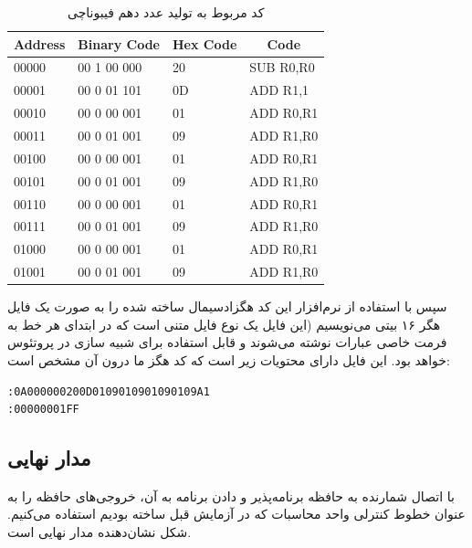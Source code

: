 \documentclass{article}
\begin{document}
\begin{table}[H]
\centering
\begin{latin}
\begin{tabular}{|l|l|l|l|}
\hline
\multicolumn{1}{|c|}{\textbf{Address}} & \multicolumn{1}{c|}{\textbf{Binary Code}} & \multicolumn{1}{c|}{\textbf{Hex Code}} & \multicolumn{1}{c|}{\textbf{Code}} \\ \hline
00000 & 00 1 00 000 & 20 & SUB R0,R0 \\ \hline
00001 & 00 0 01 101 & 0D & ADD R1,1  \\ \hline
00010 & 00 0 00 001 & 01 & ADD R0,R1 \\ \hline
00011 & 00 0 01 001 & 09 & ADD R1,R0 \\ \hline
00100 & 00 0 00 001 & 01 & ADD R0,R1 \\ \hline
00101 & 00 0 01 001 & 09 & ADD R1,R0 \\ \hline
00110 & 00 0 00 001 & 01 & ADD R0,R1 \\ \hline
00111 & 00 0 01 001 & 09 & ADD R1,R0 \\ \hline
01000 & 00 0 00 001 & 01 & ADD R0,R1 \\ \hline
01001 & 00 0 01 001 & 09 & ADD R1,R0 \\ \hline
\end{tabular}
\end{latin}
\caption{کد مربوط به تولید عدد دهم فیبوناچی}
\label{tab:codes}
\end{table}

سپس با استفاده از نرم‌افزار  این کد هگزادسیمال ساخته شده را به صورت یک فایل هگر ۱۶ بیتی می‌نویسیم (این فایل یک نوع فایل متنی است که در ابتدای هر خط به فرمت خاصی عبارات نوشته می‌شوند و قابل استفاده برای شبیه سازی  در پروتئوس خواهد بود. این فایل دارای محتویات زیر است که کد هگز ما درون آن مشخص است:

\begin{latin}
\begin{lstlisting}
:0A000000200D0109010901090109A1
:00000001FF
\end{lstlisting}
\end{latin}

\subsection{مدار نهایی}
با اتصال شمارنده به حافظه برنامه‌پذیر و دادن برنامه به آن، خروجی‌های حافظه را به عنوان خطوط کنترلی واحد محاسبات که در آزمایش قبل ساخته بودیم استفاده می‌کنیم. شکل  نشان‌دهنده مدار نهایی است.
\end{document}
